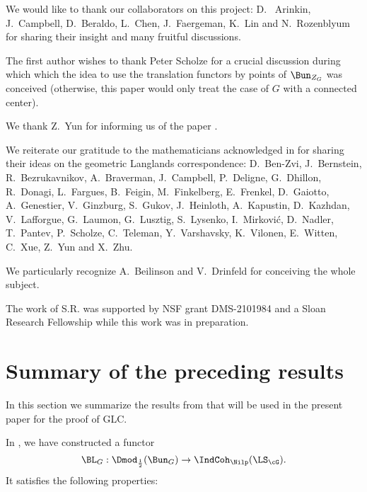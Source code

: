 \documentclass[9pt]{amsart}
\theoremstyle{remark}
\theoremstyle{definition}
\theoremstyle{remark}
\numberwithin{equation}{section}
\begin{document}

We would like to thank our collaborators on this project: D. ~Arinkin, J.~Campbell, D.~Beraldo, L.~Chen, J.~Faergeman, K.~Lin and N.~Rozenblyum
for sharing their insight and many fruitful discussions. 

\medskip

The first author wishes to thank Peter Scholze for a crucial discussion during
which which the idea to use the translation functors 
by points of $\Bun_{Z_G}$ was conceived (otherwise, this paper would only treat the case of $G$ with a connected center). 

\medskip

We thank Z.~Yun for informing us of the paper \cite{BFM}.

\medskip

We reiterate our gratitude to the mathematicians acknowledged in \cite{GLC1} for 
sharing their ideas on the geometric Langlands correspondence:
D.~Ben-Zvi, J.~Bernstein, R.~Bezrukavnikov, A.~Braverman, J.~Campbell, P.~Deligne, 
G.~Dhillon, R.~Donagi, L.~Fargues, B.~Feigin, M.~Finkelberg, E.~Frenkel, D.~Gaiotto, A.~Genestier, V.~Ginzburg, 
S.~Gukov, J.~Heinloth, A.~Kapustin, D.~Kazhdan, 
V.~Lafforgue, G.~Laumon, G.~Lusztig, S.~Lysenko, I.~Mirkovi\'c, D.~Nadler, T.~Pantev, P.~Scholze, 
C.~Teleman, Y.~Varshavsky, K.~Vilonen, E.~Witten, C.~Xue, Z.~Yun and X.~Zhu.

\medskip

We particularly recognize A.~Beilinson and V.~Drinfeld for conceiving the whole subject.

\medskip 

The work of S.R. was supported by NSF grant DMS-2101984 and a Sloan Research Fellowship 
while this work was in preparation. 


\section{Summary of the preceding results} \label{s:review}

In this section we summarize the results from \cite{GLC1,GLC2,GLC3,GLC4} that will be used in 
the present paper for the proof of GLC. 


\sssec{}

In \cite[Sect. 1]{GLC1}, we have constructed a functor
$$\BL_G:\Dmod_{\frac{1}{2}}(\Bun_G) \to \IndCoh_\Nilp(\LS_{\cG}).$$
It satisfies the following properties:
\end{document}
